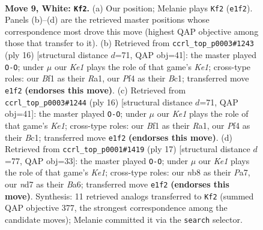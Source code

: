 \documentclass[11pt]{article}
\begin{document}
\clearpage

\begin{figure}[p]\centering
\begin{subfigure}{0.46\textwidth}\centering
\resizebox{\linewidth}{!}{%
\newchessgame
\chessboard[
  setfen={rnb2rk1/1ppnqppp/p3p3/3pP3/3P1P2/2N4N/PPP3PP/R2QKB1R w KQ - 2 9},
  showmover=false,
  pgfstyle=straightmove, color=movearrow, markmove={e1-f2}
]}
\caption{}
\end{subfigure}\hfill
\begin{subfigure}{0.46\textwidth}\centering
\resizebox{\linewidth}{!}{%
\newchessgame
\chessboard[
  setfen={rnbq1rk1/pp3pbp/2pp1np1/8/2PNP3/2N3P1/PP3PBP/R1BQK2R w KQ - 1 9},
  showmover=false,
  pgfstyle=straightmove, color=movearrow, markmove={e1-g1}
]}
\caption{}
\end{subfigure}
\\[4pt]
\begin{subfigure}{0.46\textwidth}\centering
\resizebox{\linewidth}{!}{%
\newchessgame
\chessboard[
  setfen={rnbq1rk1/pp3pbp/2pp1np1/8/2PNP3/2N3P1/PP3PBP/R1BQK2R w KQ - 1 9},
  showmover=false,
  pgfstyle=straightmove, color=movearrow, markmove={e1-g1}
]}
\caption{}
\end{subfigure}\hfill
\begin{subfigure}{0.46\textwidth}\centering
\resizebox{\linewidth}{!}{%
\newchessgame
\chessboard[
  setfen={r2qk2r/p2p1ppp/bpn1pn2/2p5/2PP4/5NP1/PPQ1PPBP/RN3RK1 b kq - 3 9},
  showmover=false,
  pgfstyle=straightmove, color=movearrow, markmove={e8-g8}
]}
\caption{}
\end{subfigure}
\caption{\textbf{Move 9, White: \texttt{Kf2}.} (a) Our position; Melanie plays \texttt{Kf2} (\texttt{e1f2}). Panels (b)--(d) are the retrieved master positions whose correspondence most drove this move (highest QAP objective among those that transfer to it). (b) Retrieved from \texttt{ccrl\_top\_p0003\#1243} (ply 16) [structural distance $d$=71, QAP obj=41]: the master played \texttt{O-O}; under $\mu$ our \emph{Ke1} plays the role of that game's \emph{Ke1}; cross-type roles: our \emph{B}f1 as their \emph{R}a1, our \emph{P}f4 as their \emph{B}c1; transferred move \texttt{e1f2} \textbf{(endorses this move)}. (c) Retrieved from \texttt{ccrl\_top\_p0003\#1244} (ply 16) [structural distance $d$=71, QAP obj=41]: the master played \texttt{O-O}; under $\mu$ our \emph{Ke1} plays the role of that game's \emph{Ke1}; cross-type roles: our \emph{B}f1 as their \emph{R}a1, our \emph{P}f4 as their \emph{B}c1; transferred move \texttt{e1f2} \textbf{(endorses this move)}. (d) Retrieved from \texttt{ccrl\_top\_p0001\#1419} (ply 17) [structural distance $d$=77, QAP obj=33]: the master played \texttt{O-O}; under $\mu$ our \emph{Ke1} plays the role of that game's \emph{Ke1}; cross-type roles: our \emph{n}b8 as their \emph{P}a7, our \emph{n}d7 as their \emph{B}a6; transferred move \texttt{e1f2} \textbf{(endorses this move)}. Synthesis: 11 retrieved analogs transferred to \texttt{Kf2} (summed QAP objective 377, the strongest correspondence among the candidate moves); Melanie committed it via the \texttt{search} selector.}
\label{fig:thought-m16}
\end{figure}
\end{document}
